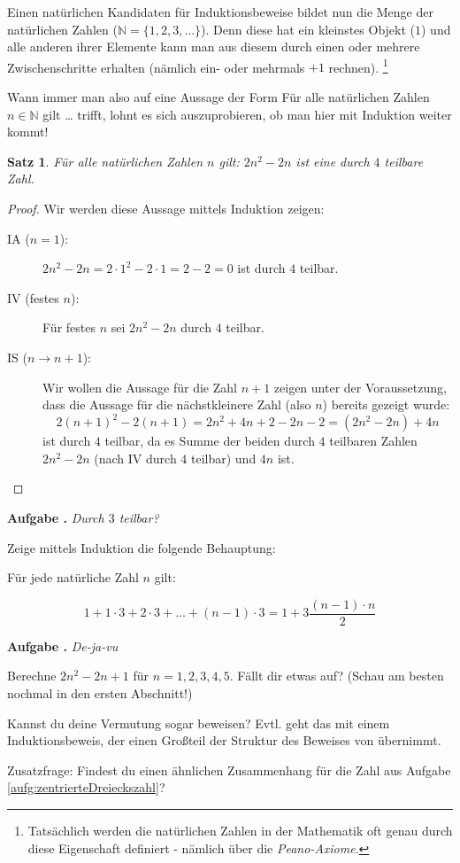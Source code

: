 \documentclass[a4paper,ngerman,12pt]{scrartcl}
\newcommand{\NN}{\mathbb{N}}
\theoremstyle{definition}
\theoremstyle{plain}
\newtheorem{satz}[defn]{Satz}
\theoremstyle{remark}
\newlength{\aufgabenskip}
\newcounter{aufgabennummer}
\newenvironment{aufgabe}[1]{
	\addtocounter{aufgabennummer}{1}
	\textbf{Aufgabe \theaufgabennummer.} \emph{#1} \par
}{\vspace{\aufgabenskip}}
\begin{document}
Einen natürlichen Kandidaten für Induktionsbeweise bildet nun die Menge der natürlichen Zahlen ($\mathbb{N} = \{1,2,3, \dots\}$). Denn diese hat ein kleinstes Objekt ($1$) und alle anderen ihrer Elemente kann man aus diesem durch einen oder mehrere Zwischenschritte erhalten (nämlich ein- oder mehrmals $+1$ rechnen).
\footnote{Tatsächlich werden die natürlichen Zahlen in der Mathematik oft genau durch diese Eigenschaft definiert - nämlich über die \emph{Peano-Axiome}.}

Wann immer man also auf eine Aussage der Form \glqq Für alle natürlichen Zahlen $n \in \NN$ gilt \dots\grqq{} trifft, lohnt es sich auszuprobieren, ob man hier mit Induktion weiter kommt!

\begin{satz}\label{satz:zentrierteViereckszahl}
	Für alle natürlichen Zahlen $n$ gilt: $2n^2-2n$ ist eine durch $4$ teilbare Zahl.
\end{satz}

\begin{proof}
	Wir werden diese Aussage mittels Induktion zeigen:
	\begin{description}
		\item[IA ($n=1$):] $2n^2-2n  = 2\cdot 1^2 -2 \cdot 1 = 2-2 = 0$ ist durch $4$ teilbar.
		\item[IV (festes $n$):] Für festes $n$ sei $2n^2-2n$ durch $4$ teilbar.
		\item[IS ($n \to n+1$):] Wir wollen die Aussage für die Zahl $n+1$ zeigen unter der Voraussetzung, dass die Aussage für die nächstkleinere Zahl (also $n$) bereits gezeigt wurde:
		\[2(n+1)^2-2(n+1)  = 2n^2+4n+2-2n-2 = (2n^2-2n) + 4n\]
		ist durch $4$ teilbar, da es Summe der beiden durch $4$ teilbaren Zahlen $2n^2-2n$ (nach IV durch $4$ teilbar) und $4n$ ist. \qedhere
	\end{description}
\end{proof}

\begin{aufgabe}{Durch $3$ teilbar?}\label{aufg:zentrierteDreieckszahl}
	Zeige mittels Induktion die folgende Behauptung:
	
	Für jede natürliche Zahl $n$ gilt:
	
	\[1 + 1\cdot3 + 2\cdot3 + \dots + (n-1)\cdot 3 = 1 + 3\frac{(n-1)\cdot n}{2}\] 
\end{aufgabe}

\begin{aufgabe}{De-ja-vu}\label{aufg:dejavu}
	Berechne $2n^2-2n+1$ für $n = 1,2,3,4,5$. Fällt dir etwas auf? (Schau am besten nochmal in den ersten Abschnitt!) 
	
	Kannst du deine Vermutung sogar beweisen? Evtl. geht das mit einem Induktionsbeweis, der einen Großteil der Struktur des Beweises von  übernimmt.
	
	Zusatzfrage: Findest du einen ähnlichen Zusammenhang für die Zahl aus Aufgabe \ref{aufg:zentrierteDreieckszahl}?
\end{aufgabe}
\end{document}
